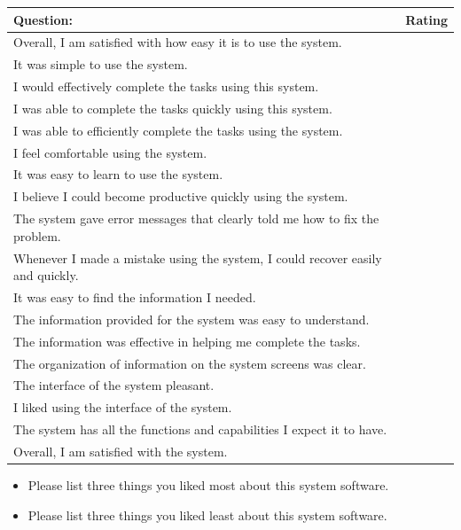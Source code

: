 \documentclass[12pt]{article}
\begin{document}
\begin{center}
\begin{tabular}{|l|p{2cm}|}
\hline
 Question: & Rating \\
\hline
	Overall, I am satisfied with how easy it is to use the system. &  \\ \hline
	It was simple to use the system. & \\ \hline
	I would effectively complete the tasks using this system. & \\ \hline
	I was able to complete the tasks quickly using this system. & \\ \hline
	I was able to efficiently complete the tasks using the system. & \\ \hline
	I feel comfortable using the system. & \\ \hline
	It was easy to learn to use the system. & \\ \hline
	I believe I could become productive quickly using the system. & \\ \hline
	The system gave error messages that clearly told me how to fix the problem. & \\ \hline
	Whenever I made a mistake using the system, I could recover easily and quickly. & \\ \hline
	It was easy to find the information I needed. & \\ \hline
	The information provided for the system was easy to understand. & \\ \hline
	The information was effective in helping me complete the tasks. & \\ \hline
	The organization of information on the system screens was clear. & \\ \hline
	The interface of the system pleasant. & \\ \hline
 I liked using the interface of the system. & \\ \hline
	The system has all the functions and capabilities I expect it to have. & \\ \hline
	Overall, I am satisfied with the system. & \\ \hline

\end{tabular}
\end{center}
\begin{itemize}
\item	Please list three things you liked most about this system software.

\item	Please list three things you liked least about this system software.

\end{itemize}
\end{document}
